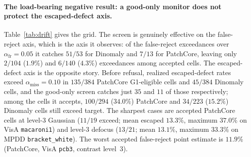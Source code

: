 \documentclass[preprint,11pt]{elsarticle}
\begin{document}
\paragraph{The load-bearing negative result: a good-only monitor does not protect the
escaped-defect axis.} Table~\ref{tab:drift} gives the grid. The screen is genuinely effective on the
false-reject axis, which is the axis it observes: of the false-reject exceedances over
$\alpha_{\text{fr}}=0.05$ it catches $51/53$ for Dinomaly and $7/13$ for PatchCore, leaving only
$2/104$ ($1.9\%$) and $6/140$ ($4.3\%$) exceedances among accepted cells. The escaped-defect axis is
the opposite story. Before refusal, realized escaped-defect rates exceed
$\alpha_{\text{miss}}=0.10$ in $135/384$ PatchCore G1-eligible cells and $45/384$ Dinomaly cells,
and the good-only screen catches just $35$ and $11$ of those respectively; among the cells it accepts,
$100/294$ ($34.0\%$) PatchCore and $34/223$ ($15.2\%$) Dinomaly cells still exceed target. The
sharpest cases are accepted PatchCore cells at level-3 Gaussian ($11/19$ exceed; mean escaped
$13.3\%$, maximum $37.0\%$ on VisA \texttt{macaroni1}) and level-3 defocus ($13/21$; mean $13.1\%$,
maximum $33.3\%$ on MPDD \texttt{bracket\_white}). The worst accepted false-reject point estimate is
$11.9\%$ (PatchCore, VisA \texttt{pcb3}, contrast level~3).
\end{document}

